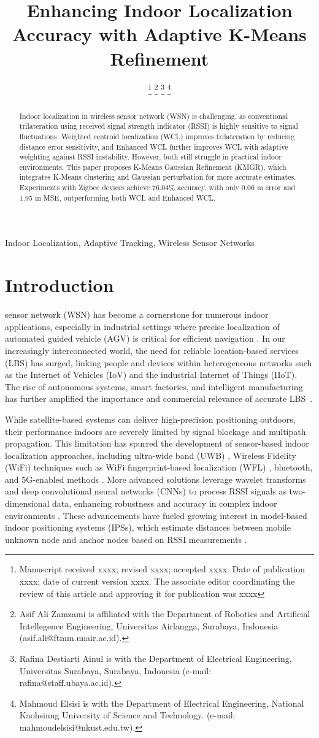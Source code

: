 \documentclass[journal]{IEEEtran}
\title{Enhancing Indoor Localization Accuracy with Adaptive K-Means Refinement}
\author{
\IEEEauthorblockN{Asif~Ali~Zamzami,~\IEEEmembership{Member,~IEEE}, Rafina~Destiarti~Ainul, Mahmoud~Elsisi,~\IEEEmembership{Senior Member,~IEEE}}
\thanks{Manuscript received xxxx; revised xxxx; accepted
xxxx. Date of publication xxxx; date of current
version xxxx. 
The associate editor coordinating the review of this article and approving it for publication was xxxx
}
\thanks{Asif Ali Zamzami is affiliated with the Department of Robotics and Artificial Intellegence Engineering, Universitas Airlangga, Surabaya, Indonesia (asif.ali@ftmm.unair.ac.id).}
\thanks{Rafina Destiarti Ainul is with the Department of Electrical Engineering, Universitas Surabaya, Surabaya, Indonesia (e-mail: rafina@staff.ubaya.ac.id).}
\thanks{Mahmoud Elsisi is with the Department of Electrical Engineering, National Kaohsiung University of Science and Technology. (e-mail: mahmoudelsisi@nkust.edu.tw).}
}
\begin{document}
\maketitle


\begin{abstract}
Indoor localization in wireless sensor network (WSN) is challenging, as conventional trilateration using received signal strength indicator (RSSI) is highly sensitive to signal fluctuations. Weighted centroid localization (WCL) improves trilateration by reducing distance error sensitivity, and Enhanced WCL further improves WCL with adaptive weighting against RSSI instability. However, both still struggle in practical indoor environments. This paper proposes K-Means Gaussian Refinement (KMGR), which integrates K-Means clustering and Gaussian perturbation for more accurate estimates. Experiments with Zigbee devices achieve 76.04\% accuracy, with only 0.06 m error and 1.95 m MSE, outperforming both WCL and Enhanced WCL.
\end{abstract}

\begin{IEEEkeywords}
Indoor Localization, Adaptive Tracking, Wireless Sensor Networks
\end{IEEEkeywords}


\IEEEpeerreviewmaketitle

\section{Introduction}


 sensor network (WSN) has become a cornerstone for numerous indoor applications, especially in industrial settings where precise localization of automated guided vehicle (AGV) is critical for efficient navigation \cite{robust}. In our increasingly interconnected world, the need for reliable location-based services (LBS) has surged, linking people and devices within heterogeneous networks such as the Internet of Vehicles (IoV) and the industrial Internet of Things (IIoT). The rise of autonomous systems, smart factories, and intelligent manufacturing has further amplified the importance and commercial relevance of accurate LBS~\cite{robot}.

While satellite-based systems can deliver high-precision positioning outdoors, their performance indoors are severely limited by signal blockage and multipath propagation. This limitation has spurred the development of sensor-based indoor localization approaches, including ultra-wide band (UWB) \cite{uwb}, Wireless Fidelity (WiFi) techniques such as WiFi fingerprint-based localization (WFL) \cite{adversarial}, bluetooth, and 5G-enabled methods \cite{stopping}. More advanced solutions leverage wavelet transforms and deep convolutional neural networks (CNNs) to process RSSI signals as two-dimensional data, enhancing robustness and accuracy in complex indoor environments \cite{robust}. These advancements have fueled growing interest in model-based indoor positioning systems (IPSs), which estimate distances between mobile unknown node and anchor nodes based on RSSI measurements \cite{adaptive}.
\end{document}
